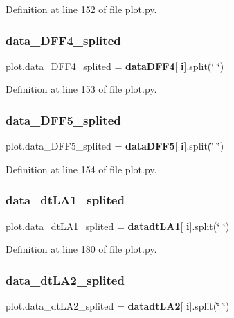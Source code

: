 Definition at line 152 of file plot.\+py.

\mbox{\label{namespaceplot_aadbac3405bbf4176c9678b0fa843e361}} 
\subsubsection{data\+\_\+\+D\+F\+F4\+\_\+splited}
{\footnotesize\ttfamily plot.\+data\+\_\+\+D\+F\+F4\+\_\+splited = \textbf{ data\+D\+F\+F4}[\textbf{ i}].split(\char`\"{} \char`\"{})}



Definition at line 153 of file plot.\+py.

\mbox{\label{namespaceplot_a386a066e2c65d729d189bc4abac41125}} 
\subsubsection{data\+\_\+\+D\+F\+F5\+\_\+splited}
{\footnotesize\ttfamily plot.\+data\+\_\+\+D\+F\+F5\+\_\+splited = \textbf{ data\+D\+F\+F5}[\textbf{ i}].split(\char`\"{} \char`\"{})}



Definition at line 154 of file plot.\+py.

\mbox{\label{namespaceplot_a3b793c424049f582b9a17ea53acaecce}} 
\subsubsection{data\+\_\+dt\+L\+A1\+\_\+splited}
{\footnotesize\ttfamily plot.\+data\+\_\+dt\+L\+A1\+\_\+splited = \textbf{ datadt\+L\+A1}[\textbf{ i}].split(\char`\"{} \char`\"{})}



Definition at line 180 of file plot.\+py.

\mbox{\label{namespaceplot_a276fc3ba95f49721ad282a88c878013a}} 
\subsubsection{data\+\_\+dt\+L\+A2\+\_\+splited}
{\footnotesize\ttfamily plot.\+data\+\_\+dt\+L\+A2\+\_\+splited = \textbf{ datadt\+L\+A2}[\textbf{ i}].split(\char`\"{} \char`\"{})}




